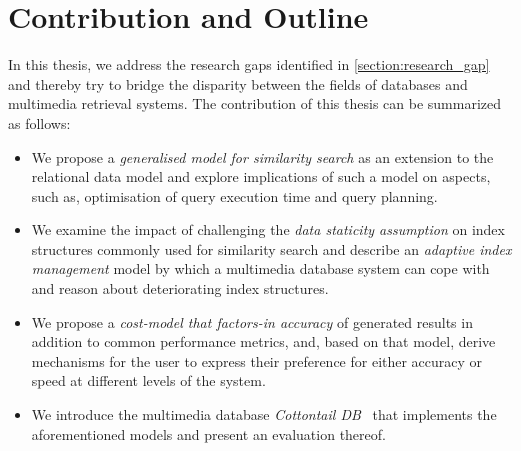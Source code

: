 


\section{Contribution and Outline}
\label{section:contributions}

In this thesis, we address the research gaps identified in \cref{section:research_gap} and thereby try to bridge the disparity between the fields of databases and multimedia retrieval systems. The contribution of this thesis can be summarized as follows:

\begin{itemize}
    \item We propose a \emph{generalised model for similarity search} as an extension to the relational data model and explore implications of such a model on aspects, such as, optimisation of query execution time and query planning.
    \item We examine the impact of challenging the \emph{data staticity assumption} on index structures commonly used for similarity search and describe an \emph{adaptive index management} model by which a multimedia database system can cope with and reason about deteriorating index structures.
    \item We propose a \emph{cost-model that factors-in accuracy} of generated results in addition to common performance metrics, and, based on that model, derive mechanisms for the user to express their preference for either accuracy or speed at different levels of the system.
    \item We introduce the multimedia database \emph{Cottontail DB}~\cite{Gasser:2020Cottontail} that implements the aforementioned models and present an evaluation thereof.
\end{itemize}


